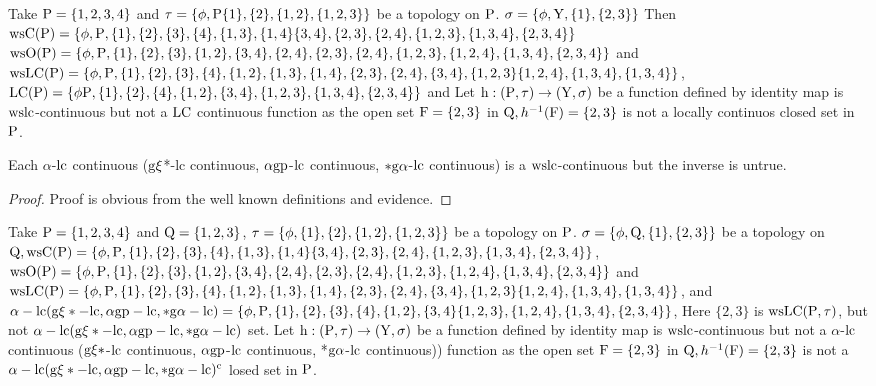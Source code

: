 \begin{exm}\label{exam6.3.4}
Take $\mathrm{P} = \{1, 2, 3, 4\}$ and $\tau = \{\phi, \mathrm{P} \{1\}, \{2\}, \{1, 2\}, \{1, 2, 3\}\}$ be a topology on $\mathrm{P}$. $\sigma = \{\phi, \mathrm{Y}, \{1\},\{ 2, 3\}\}$ Then $\ws\TSC(\TSP) = \{\phi, \TSP,\{1\}, \{2\}, \{3\}, \{4\}, \{1,3\},\break \{1, 4\} \{3,4\},\{2,3\}, \{2,4\}, \{1,2, 3\},\{1,3,4\},\{2,3,4\}\}$ $\ws\TSO(\TSP) = \{\phi, \TSP, \{1\}, \{2\}, \{3\},\break \{1,2\}, \{3,4\}, \{2,4\},\{2,3\}, \{2,4\}, \{1,2,3\}, \{1,2,4\},\{1,3,4\},\{2,3,4\}\}$ and $\ws\LC(\TSP)= \{\phi,\TSP ,\{1\}, \{2\},\{3\},\{4\},\{1,2\},\{1,3\}, \{1,4\}, \{2,3\}, \{2,4\},\{3,4\}, \{1,2,3\}\{1,2,4\},\break \{1,3,4\},\{1,3,4\}\}$, $\LC(\TSP)=\{ \phi \TSP,\{1\}, \{2\}, \{4\}, \{1, 2\}, \{3,4\}, \{1,2,3\},\{1,3,4\},\break \{2,3,4\}\}$ and Let $\mathrm{h}: (\mathrm{P}, \tau )\to(\mathrm{Y}, \sigma)$ be a function defined by identity map is $\mathrm{ws}\mathrm{lc}$-continuous but not a $\mathrm{LC}$ continuous function as the open set $\mathrm{F}=\{2,3\}$ in $\mathrm{Q}, h^{-1} (\mathrm{F})=\{2,3\}$ is not a locally continuos closed set in $\mathrm{P}$.
\end{exm}

\begin{thm}\label{thm6.3.5}
Each $\alpha$-$\mathrm{lc}$ continuous ($\mathrm{g}\xi$*-lc continuous, $\alpha\mathrm{gp}$-$\mathrm{lc}$ continuous, $*\mathrm{g}\alpha$-$\mathrm{lc}$ continuous) is a $\mathrm{ws}\mathrm{lc}$-continuous but the inverse is untrue.
\end{thm}

\begin{proof}
Proof is obvious from the well known definitions and evidence.
\end{proof}

\begin{exm}\label{exam6.3.6}
Take $\mathrm{P} = \{1, 2, 3, 4\}$ and $\mathrm{Q} = \{1, 2, 3\}$, $\tau = \{\phi, \{1\}, \{2\}, \{1, 2\},\break \{1, 2, 3\}\}$ be a topology on $\mathrm{P}$. $\sigma = \{\phi, \mathrm{Q}, \{1\},\{ 2, 3\}\}$ be a topology on $\mathrm{Q}, \mathrm{ws}\mathrm{C}(\mathrm{P}) = \{\phi, \mathrm{P},\{1\}, \{2\}, \{3\}, \{4\}, \{1,3\}, \{1, 4\} \{3,4\}, \{2,3\}, \{2,4\}, \{1,2, 3\},\{1,3,4\},\{2,3,4\}\}$,\break $\ws\TSO(\TSP) = \{\phi, \TSP, \{1\}, \{2\},\{3\},\{1,2\}, \{3,4\}, \{2,4\}, \{2,3\}, \{2,4\}, \{1,2,3\}, \{1,2,4\},\break \{1,3,4\},\{2,3,4\}\}$ and $\ws\LC(\TSP)= \{\phi, \TSP,\{1\}, \{2\}, \{3\},\{4\},\{1,2\},\{1,3\}, \{1,4\},\break \{2,3\}, \{2,4\},\{3,4\}, \{1,2,3\}\{1,2,4\},\{1,3,4\},\{1,3,4\}\}$, and $\alpha - \lc(\TSg\xi* -\lc, \alpha \gp-\lc, *\TSg\alpha-\lc) = \{ \phi, \TSP, \{1\}, \{2\}, \{3\}, \{4\}, \{1,2\}, \{3, 4\} \{1,2,3\},\{1,2,4\},\{1,3,4\},\break \{2,3,4\}\}$, Here $\{2,3\}$ is $\mathrm{ws}\mathrm{LC} (\mathrm{P}, \tau)$, but not $\alpha - \mathrm{lc}(\mathrm{g}\xi* -\mathrm{lc}, \alpha\mathrm{gp}-\mathrm{lc}, *\mathrm{g}\alpha-\mathrm{lc})$ set. Let $\mathrm{h}: (\mathrm{P}, \tau )\to(\mathrm{Y}, \sigma)$ be a function defined by identity map is $\mathrm{ws}\mathrm{lc}$-continuous but not a $\alpha$-$\mathrm{lc}$ continuous ($\mathrm{g}\xi*$-$\mathrm{lc}$ continuous, $\alpha\mathrm{gp}$-$\mathrm{lc}$ continuous, *$\mathrm{g}\alpha$-$\mathrm{lc}$ continuous)) function as the open set $\mathrm{F}=\{2,3\}$ in $\mathrm{Q}, h^{-1} (\mathrm{F})=\{2,3\}$ is not a $\alpha - \mathrm{lc}(\mathrm{g}\xi * -\mathrm{lc}, \alpha\mathrm{gp}-\mathrm{lc}, *\mathrm{g}\alpha-\mathrm{lc})^{\text{c}}$ losed set in $\mathrm{P}$.
\end{exm}

